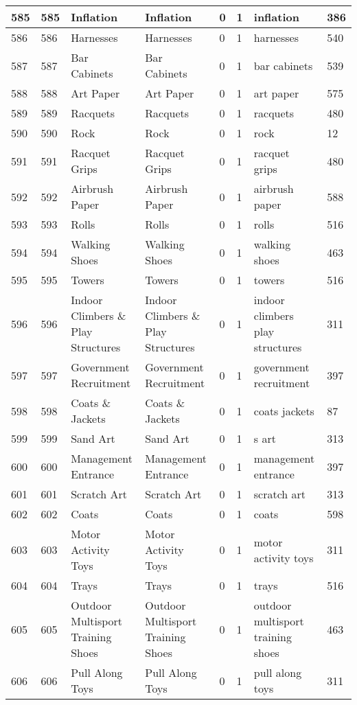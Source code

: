 \begin{longtable}{|l|l|l|l|l|l|l|l|}
585 & 585 & Inflation & Inflation & 0 & 1 & inflation & 386 \\ \hline 
586 & 586 & Harnesses & Harnesses & 0 & 1 & harnesses & 540 \\ \hline 
587 & 587 & Bar Cabinets & Bar Cabinets & 0 & 1 & bar cabinets & 539 \\ \hline 
588 & 588 & Art Paper & Art Paper & 0 & 1 & art paper & 575 \\ \hline 
589 & 589 & Racquets & Racquets & 0 & 1 & racquets & 480 \\ \hline 
590 & 590 & Rock & Rock & 0 & 1 & rock & 12 \\ \hline 
591 & 591 & Racquet Grips & Racquet Grips & 0 & 1 & racquet grips & 480 \\ \hline 
592 & 592 & Airbrush Paper & Airbrush Paper & 0 & 1 & airbrush paper & 588 \\ \hline 
593 & 593 & Rolls & Rolls & 0 & 1 & rolls & 516 \\ \hline 
594 & 594 & Walking Shoes & Walking Shoes & 0 & 1 & walking shoes & 463 \\ \hline 
595 & 595 & Towers & Towers & 0 & 1 & towers & 516 \\ \hline 
596 & 596 & Indoor Climbers \& Play Structures & Indoor Climbers \& Play Structures & 0 & 1 & indoor climbers play structures & 311 \\ \hline 
597 & 597 & Government Recruitment & Government Recruitment & 0 & 1 & government recruitment & 397 \\ \hline 
598 & 598 & Coats \& Jackets & Coats \& Jackets & 0 & 1 & coats jackets & 87 \\ \hline 
599 & 599 & Sand Art & Sand Art & 0 & 1 & s art & 313 \\ \hline 
600 & 600 & Management Entrance & Management Entrance & 0 & 1 & management entrance & 397 \\ \hline 
601 & 601 & Scratch Art & Scratch Art & 0 & 1 & scratch art & 313 \\ \hline 
602 & 602 & Coats & Coats & 0 & 1 & coats & 598 \\ \hline 
603 & 603 & Motor Activity Toys & Motor Activity Toys & 0 & 1 & motor activity toys & 311 \\ \hline 
604 & 604 & Trays & Trays & 0 & 1 & trays & 516 \\ \hline 
605 & 605 & Outdoor Multisport Training Shoes & Outdoor Multisport Training Shoes & 0 & 1 & outdoor multisport training shoes & 463 \\ \hline 
606 & 606 & Pull Along Toys & Pull Along Toys & 0 & 1 & pull along toys & 311 \\ \hline 

\end{longtable}
